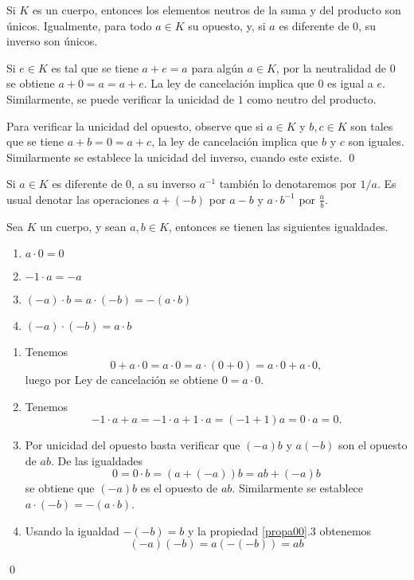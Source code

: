 \begin{prop}
Si $K$ es un cuerpo, entonces los elementos neutros de la suma y del producto son \'unicos. Igualmente, para todo $a\in K$ su opuesto, y, si $a$ es diferente de $0$, su inverso son \'unicos.
\end{prop}

\dem Si $e\in K$ es tal que se tiene $a+e=a$ para alg\'un $a\in K$, por la neutralidad de $0$ se obtiene $a+0=a=a+e$. La ley de cancelaci\'on implica que $0$ es igual a $e$. Similarmente, se puede verificar la unicidad de $1$ como neutro del producto.

\noindent Para verificar la unicidad del opuesto, observe que si $a\in K$ y $b,c\in K$ son tales que se tiene $a+b=0=a+c$, la ley de cancelaci\'on implica que $b$ y $c$ son iguales. Similarmente se establece la unicidad del inverso, cuando este existe. \qed


\begin{nota}
Si $a\in K$ es diferente de $0$, a su inverso $a^{-1}$ tambi\'en lo denotaremos por $1/a$. Es usual denotar las operaciones $a+(-b)$ por $a-b$ y $a\cdot b^{-1}$ por $\frac{a}{b}$.
\end{nota}

\begin{pro}\label{propa00}
Sea $K$ un cuerpo, y sean $a,b\in K$, entonces se tienen las siguientes igualdades.
\begin{enumerate}
\item $a\cdot 0=0$
\item $-1\cdot a=-a$
\item $(-a)\cdot b=a\cdot(-b)=-(a\cdot b)$
\item $(-a)\cdot (-b)=a\cdot b$
\end{enumerate}
\end{pro}

\dem
\begin{enumerate}
\item Tenemos
\[
0+a\cdot 0=a\cdot 0=a\cdot (0+0)=a\cdot 0+ a\cdot 0,
\]
luego por Ley de cancelaci\'on se obtiene $0=a\cdot 0$.
\item Tenemos
\[
-1\cdot a+a=-1\cdot a+1\cdot a=(-1+1)a=0\cdot a=0.
\]
\item Por unicidad del opuesto basta verificar que $(-a)b$ y $a(-b)$ son el opuesto de $ab$. De las igualdades
\[
0=0\cdot b=\left( a+(-a)\right) b=ab+(-a)b
\]
se obtiene que $(-a)b$ es el opuesto de $ab$. Similarmente se establece $a\cdot(-b)=-(a\cdot b)$.
\item Usando la igualdad $-(-b)=b$ y la propiedad \ref{propa00}.3 obtenemos
\[
(-a)(-b)=a\left(-(-b)\right) =ab
\]
\end{enumerate}\qed

